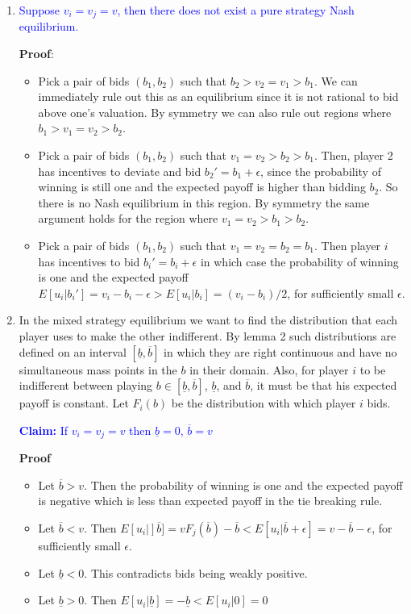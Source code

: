\documentclass[11pt,english]{article}
\begin{document}
\begin{enumerate}
\item \textcolor{blue}{Suppose $v_{i}=v_{j}=v$, then there does not exist a pure strategy Nash equilibrium.}

\textbf{Proof}:
\begin{itemize}
\item Pick a pair of bids $(b_{1}, b_{2})$ such that $b_{2}>v_{2}=v_{1}>b_{1}$. We can immediately rule out this as an equilibrium since it is not rational to bid above one's valuation. By symmetry we can also rule out regions where $b_{1}>v_{1}=v_{2}>b_{2}$.
\item Pick a pair of bids $(b_{1}, b_{2})$ such that $v_{1}=v_{2}>b_{2}>b_{1}$. Then, player 2 has incentives to deviate and bid $b_{2}'=b_{1}+\epsilon$, since the probability of winning is still one and the expected payoff is higher than bidding $b_{2}$. So there is no Nash equilibrium in this region. By symmetry the same argument holds for the region where $v_{1}=v_{2}>b_{1}>b_{2}$.
\item Pick a pair of bids $(b_{1}, b_{2})$ such that $v_{1}=v_{2}=b_{2}=b_{1}$. Then player $i$ has incentives to bid $b_{i}'=b_{i}+\epsilon$ in which case the probability of winning is one and the expected payoff $E[u_{i}|b_{i}']=v_{i}-b_{i}-\epsilon>E[u_{i}|b_{i}]=(v_{i}-b_{i})/2$, for sufficiently small $\epsilon$.
\end{itemize}

\item In the mixed strategy equilibrium we want to find the distribution that each player uses to make the other indifferent. By lemma 2 such distributions are defined on an interval ${[\underline{b},\overline{b}]}$ in which they are right continuous and have no simultaneous mass points in the $b$ in their domain. Also, for player $i$ to be indifferent between playing $b\in{[\underline{b},\overline{b}]}$, $\underline{b}$, and $\overline{b}$, it must be that his expected payoff is constant. Let $F_{i}(b)$ be the distribution with which player $i$ bids.

\textcolor{blue}{\textbf{Claim:} If $v_{i}=v_{j}=v$ then $\underline{b}=0$, $\overline{b}=v$}

\textbf{Proof}
\begin{itemize}
\item Let $\overline{b}>v$. Then the probability of winning is one and the expected payoff is negative which is less than expected payoff in the tie breaking rule.
\item Let $\overline{b}<v$. Then $E[u_{i}|]\overline{b}]=vF_{j}(\overline{b})-\overline{b}<E[u_{i}|\overline{b}+\epsilon]=v-\overline{b}-\epsilon$, for sufficiently small $\epsilon$.
\item Let $\underline{b}<0$. This contradicts bids being weakly positive.
\item Let $\underline{b}>0$. Then $E[u_{i}|\underline{b}]=-\underline{b}<E[u_{i}|0]=0$
\end{itemize}


\end{enumerate}
\end{document}
